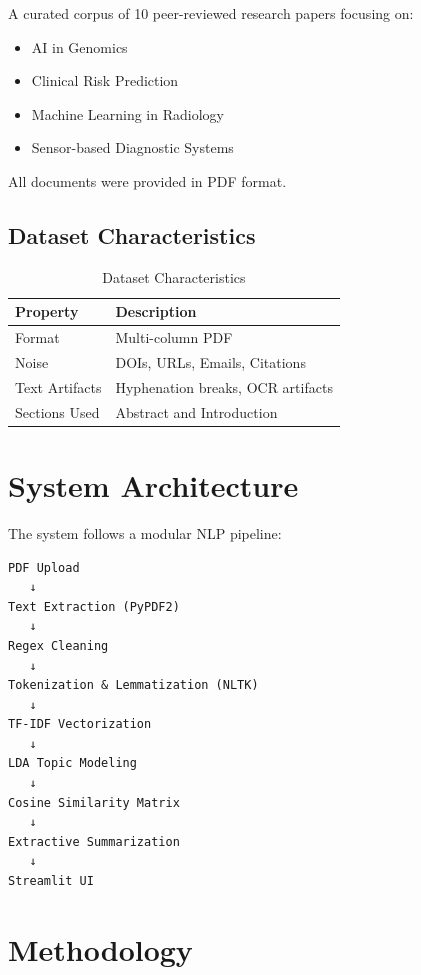 \documentclass[12pt]{article}
\begin{document}
A curated corpus of 10 peer-reviewed research papers focusing on:
\begin{itemize}
    \item AI in Genomics
    \item Clinical Risk Prediction
    \item Machine Learning in Radiology
    \item Sensor-based Diagnostic Systems
\end{itemize}

All documents were provided in PDF format.

\subsection{Dataset Characteristics}

\begin{table}[H]
\centering
\begin{tabular}{ll}
\toprule
\textbf{Property} & \textbf{Description} \\
\midrule
Format & Multi-column PDF \\
Noise & DOIs, URLs, Emails, Citations \\
Text Artifacts & Hyphenation breaks, OCR artifacts \\
Sections Used & Abstract and Introduction \\
\bottomrule
\end{tabular}
\caption{Dataset Characteristics}
\end{table}

\section{System Architecture}

The system follows a modular NLP pipeline:

\begin{verbatim}
PDF Upload
   ↓
Text Extraction (PyPDF2)
   ↓
Regex Cleaning
   ↓
Tokenization & Lemmatization (NLTK)
   ↓
TF-IDF Vectorization
   ↓
LDA Topic Modeling
   ↓
Cosine Similarity Matrix
   ↓
Extractive Summarization
   ↓
Streamlit UI
\end{verbatim}

\section{Methodology}
\end{document}
